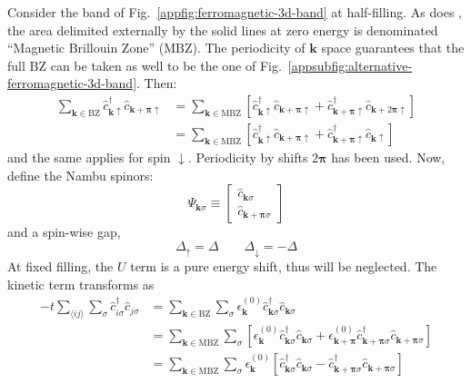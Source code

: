 Consider the band of Fig.~\ref{appfig:ferromagnetic-3d-band} at half-filling. As does \citeauthor{fabrizio2022course} \cite{fabrizio2022course}, the area delimited externally by the solid lines at zero energy is denominated ``Magnetic Brillouin Zone'' ($\mathrm{MBZ}$). The periodicity of $\mathbf{k}$ space guarantees that the full $\mathrm{BZ}$ can be taken as well to be the one of Fig.~\ref{appsubfig:alternative-ferromagnetic-3d-band}. Then:
\begin{align}
	\sum_{\mathbf{k} \in \mathrm{BZ}}
	\hat c_{\mathbf{k}\uparrow}^\dagger \hat c_{\mathbf{k}+\bm{\pi}\uparrow} &= \sum_{\mathbf{k} \in \mathrm{MBZ}}
	\left[
		\hat c_{\mathbf{k}\uparrow}^\dagger \hat c_{\mathbf{k}+\bm{\pi}\uparrow} + \hat c_{\mathbf{k}+\bm{\pi}\uparrow}^\dagger \hat c_{\mathbf{k}+2\bm{\pi}\uparrow}
	\right] \nonumber \\
	&= \sum_{\mathbf{k} \in \mathrm{MBZ}}
	\left[
		\hat c_{\mathbf{k}\uparrow}^\dagger \hat c_{\mathbf{k}+\bm{\pi}\uparrow} + \hat c_{\mathbf{k}+\bm{\pi}\uparrow}^\dagger \hat c_{\mathbf{k}\uparrow}
	\right] \label{appeq:mixed-cc-term-intermediate-passage}
\end{align}
and the same applies for spin $\downarrow$. Periodicity by shifts $2\bm{\pi}$ has been used. Now, define the Nambu spinors:
\[
	\hat \Psi_{\mathbf{k}\sigma} \equiv \begin{bmatrix}
		\hat c_{\mathbf{k}\sigma} \\
		\hat c_{\mathbf{k}+\bm{\pi}\sigma} 
	\end{bmatrix}
\]
and a spin-wise gap,
\[
	\Delta_\uparrow = \Delta
	\qquad
	\Delta_\downarrow = -\Delta
\]
At fixed filling, the $U$ term is a pure energy shift, thus will be neglected. The kinetic term transforms as
\[
\begin{aligned}
	-t \sum_{\langle ij \rangle} \sum_\sigma \hat c_{i\sigma}^\dagger \hat c_{j\sigma} &= \sum_{\mathbf{k} \in \mathrm{BZ}} \sum_\sigma \epsilon_\mathbf{k}^{(0)} \hat c_{\mathbf{k}\sigma}^\dagger \hat c_{\mathbf{k}\sigma} \\ 
	&= \sum_{\mathbf{k} \in \mathrm{MBZ}} \sum_\sigma \left[
		\epsilon_\mathbf{k}^{(0)} \hat c_{\mathbf{k}\sigma}^\dagger \hat c_{\mathbf{k}\sigma}
		+ \epsilon_{\mathbf{k}+\bm{\pi}}^{(0)} \hat c_{\mathbf{k}+\bm{\pi}\sigma}^\dagger \hat c_{\mathbf{k}+\bm{\pi}\sigma}
	\right] \\
	&= \sum_{\mathbf{k} \in \mathrm{MBZ}} \sum_\sigma \epsilon_{\mathbf{k}}^{(0)}  \left[
		\hat c_{\mathbf{k}\sigma}^\dagger \hat c_{\mathbf{k}\sigma}
		- \hat c_{\mathbf{k}+\bm{\pi}\sigma}^\dagger \hat c_{\mathbf{k}+\bm{\pi}\sigma}
	\right] \\ 
\end{aligned}
\]

